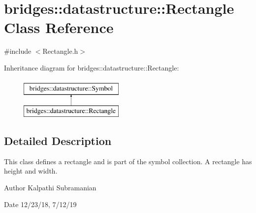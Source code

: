 \hypertarget{classbridges_1_1datastructure_1_1_rectangle}{}\section{bridges\+:\+:datastructure\+:\+:Rectangle Class Reference}
\label{classbridges_1_1datastructure_1_1_rectangle}


{\ttfamily \#include $<$Rectangle.\+h$>$}

Inheritance diagram for bridges\+:\+:datastructure\+:\+:Rectangle\+:\begin{figure}[H]
\begin{center}
\leavevmode
\includegraphics[height=2.000000cm]{classbridges_1_1datastructure_1_1_rectangle}
\end{center}
\end{figure}


\subsection{Detailed Description}
This class defines a rectangle and is part of the symbol collection. A rectangle has height and width. 

\begin{DoxyAuthor}{Author}
Kalpathi Subramanian 
\end{DoxyAuthor}
\begin{DoxyDate}{Date}
12/23/18, 7/12/19 
\end{DoxyDate}
